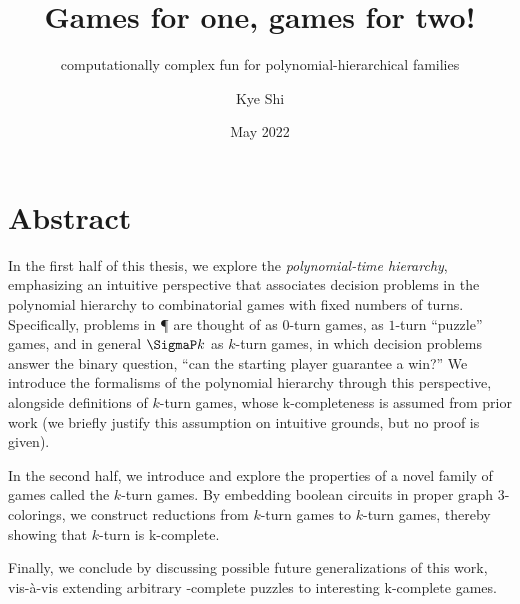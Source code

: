\documentclass{final-report}
\title{Games for one, games for two!}
\subtitle{computationally complex fun for polynomial-hierarchical families}
\author{Kye Shi}
\date{May 2022}
\begin{document}
\frontmatter
\maketitle

\chapter*{Abstract}


In the first half of this thesis, we explore the \emph{polynomial-time
hierarchy}, emphasizing an intuitive perspective that associates decision
problems in the polynomial hierarchy to combinatorial games with fixed numbers
of turns. Specifically, problems in \P{} are thought of as \(0\)-turn games,
\NP{} as \(1\)-turn ``puzzle'' games, and in general \(\SigmaP k\) as \(k\)-turn
games, in which decision problems answer the binary question, ``can the starting
player guarantee a win?'' We introduce the formalisms of the polynomial
hierarchy through this perspective, alongside definitions of \(k\)-turn
 games, whose \SigmaP k-completeness is assumed
from prior work (we briefly justify this assumption on intuitive grounds, but no
proof is given).

In the second half, we introduce and explore the properties of a novel family of
games called the \(k\)-turn  games.  By embedding
boolean circuits in proper graph 3-colorings, we construct reductions from
\(k\)-turn  games to \(k\)-turn
 games, thereby showing that \(k\)-turn
 is \SigmaP k-complete.


Finally, we conclude by discussing possible future generalizations of this work,
vis-\`a-vis extending arbitrary \NP-complete puzzles to interesting \SigmaP
k-complete games.

\end{document}
